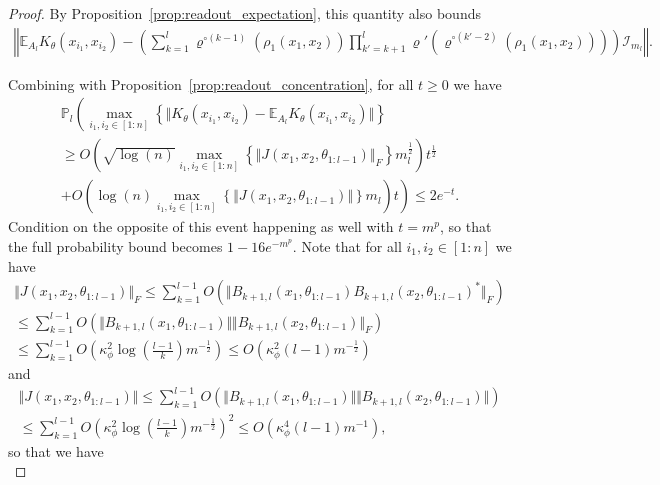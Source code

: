 \documentclass[twoside,11pt]{article}
\newcommand{\E}{\mathbb{E}}
\newcommand{\Prob}{\mathbb{P}}
\newcommand{\Id}{\mathcal{I}}
\begin{document}
\begin{proof}
By Proposition~\ref{prop:readout_expectation}, this quantity also bounds
\begin{multline*}
\left\Vert \E_{A_l} K_\theta(x_{i_1},x_{i_2}) - \left( \sum_{k=1}^l \varrho^{\circ (k-1)}(\rho_1(x_1,x_2)) \prod_{k'=k+1}^l \varrho'(\varrho^{\circ (k'-2)}(\rho_1(x_1,x_2))) \right) \Id_{m_l} \right\Vert.
\end{multline*}

Combining \citet[Lemma~2.2.13]{Vandervaartetal2023} with Proposition~\ref{prop:readout_concentration}, for all $t \geq 0$ we have
\begin{multline*}
\Prob_l\left( \max_{i_1,i_2 \in [1:n]}\left\{ \Vert K_\theta(x_{i_1},x_{i_2}) - \E_{A_l} K_\theta(x_{i_1},x_{i_2}) \Vert \right\} 
\right. \\ \left.
\geq O\left( \sqrt{\log(n)} \max_{i_1,i_2 \in [1:n]}\left\{ \Vert J(x_1,x_2,\theta_{1 : l-1}) \Vert_F \right\} m_l^{\frac{1}{2}} \right) t^{\frac{1}{2}}
\right. \\ \left. 
+ O\left( \log(n) \max_{i_1,i_2 \in [1:n]}\left\{ \Vert J(x_1,x_2,\theta_{1 : l-1}) \Vert \right\} m_l \right) t \right)
\leq 2e^{-t}.
\end{multline*}
Condition on the opposite of this event happening as well with $t = m^p$, so that the full probability bound becomes $1-16e^{-m^p}$. Note that for all $i_1,i_2 \in [1:n]$ we have
\begin{multline*}
\Vert J(x_1,x_2,\theta_{1 : l-1}) \Vert_F
\leq \sum_{k=1}^{l-1} O(\Vert B_{k+1, l}(x_1, \theta_{1 : l-1}) B_{k+1, l}(x_2, \theta_{1 : l-1})^* \Vert_F) \\
\leq \sum_{k=1}^{l-1} O(\Vert B_{k+1, l}(x_1, \theta_{1 : l-1}) \Vert \Vert B_{k+1, l}(x_2, \theta_{1 : l-1}) \Vert_F) \\
\leq \sum_{k=1}^{l-1} O\left( \kappa_\phi^2 \log\left( \frac{l-1}{k} \right) m^{-\frac{1}{2}} \right)
\leq O\left( \kappa_\phi^2 (l-1) m^{-\frac{1}{2}} \right)
\end{multline*}
and
\begin{multline*}
\Vert J(x_1,x_2,\theta_{1 : l-1}) \Vert
\leq \sum_{k=1}^{l-1} O(\Vert B_{k+1, l}(x_1, \theta_{1 : l-1}) \Vert \Vert B_{k+1, l}(x_2, \theta_{1 : l-1}) \Vert) \\
\leq \sum_{k=1}^{l-1} O\left( \kappa_\phi^2 \log\left( \frac{l-1}{k} \right) m^{-\frac{1}{2}} \right)^2
\leq O\left( \kappa_\phi^4 (l-1) m^{-1} \right),
\end{multline*}
so that we have
\begin{equation}\label{eq:limiting_readout_concentration}

\end{equation}
\end{proof}
\end{document}
